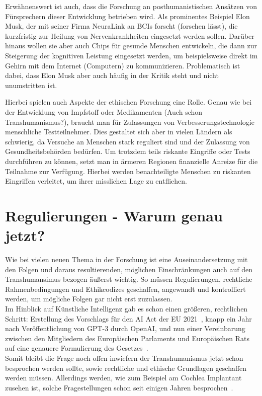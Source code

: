 \documentclass[a4paper,
DIV=13,
12pt,
BCOR=10mm,
department=FakEI,
twoside,
parskip=half,
automark,
]{OTHRartcl}
\begin{document}
Erwähnenswert ist auch, dass die Forschung an posthumanistischen Ansätzen von Fürsprechern dieser Entwicklung betrieben wird. Als prominentes Beispiel Elon Musk, der mit seiner Firma NeuraLink an BCIs forscht (forschen lässt), die kurzfristig zur Heilung von
Nervenkrankheiten eingesetzt werden sollen. Darüber hinaus wollen sie aber auch Chips für gesunde Menschen entwickeln, die dann zur Steigerung der kognitiven Leistung eingesetzt werden, um beispielsweise direkt im Gehirn mit dem Internet (Computern) zu kommunizieren.
Problematisch ist dabei, dass Elon Musk aber auch häufig in der Kritik steht und nicht unumstritten ist.

Hierbei spielen auch Aspekte der ethischen Forschung eine Rolle. Genau wie bei der Entwicklung von Impfstoff oder Medikamenten (Auch schon Transhumanismus?),
braucht man für Zulassungen von Verbesserungstechnologie menschliche Testteilnehmer. Dies gestaltet sich aber in vielen Ländern als schwierig, da Versuche an Menschen stark reguliert sind und der Zulassung von Gesundheitsbehörden bedürfen.
Um trotzdem teils riskante Eingriffe oder Tests durchführen zu können, setzt man in ärmeren Regionen finanzielle Anreize für die Teilnahme zur Verfügung. Hierbei werden benachteiligte Menschen zu riskanten Eingriffen verleitet, um ihrer misslichen Lage zu entfliehen. 

\section*{Regulierungen - Warum genau jetzt?}
Wie bei vielen neuen Thema in der Forschung ist eine
Auseinandersetzung mit den Folgen und daraus resultierenden, möglichen Einschränkungen auch auf den Transhumansimus bezogen äußerst wichtig. 
So müssen Regulierungen, rechtliche Rahmenbedingungen und Ethikcodizes geschaffen, angewandt und kontrolliert werden, um mögliche Folgen gar nicht erst zuzulassen. \\
Im Hinblick auf Künstliche Intelligenz gab es schon einen größeren, rechtlichen Schritt: Erstellung des Vorschlags für den AI Act der EU 2021~\cite{ai_act_eu_2021},
knapp ein Jahr nach Veröffentlichung von GPT-3 durch OpenAI, und nun einer Vereinbarung zwischen den Mitgliedern des Europäischen Parlaments und Europäischen Rats auf eine genauere Formulierung des Gesetzes~\cite{ai_act_deal_2023}. \\
Somit bleibt die Frage noch offen inwiefern der Transhumanismus jetzt schon besprochen werden sollte, sowie rechtliche und ethische Grundlagen geschaffen werden müssen. Allerdings werden, wie zum Beispiel am Cochlea Implantant zusehen ist,
solche Fragestellungen schon seit einigen Jahren besprochen~\cite{lee2016cochlear}.
\end{document}
